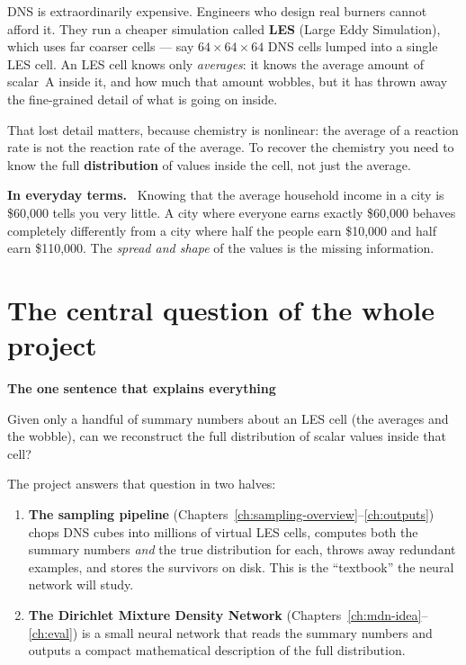 \documentclass[11pt,a4paper]{report}
\newcommand{\term}[1]{\textbf{#1}}
\renewcommand{\_}{\origtextunderscore\allowbreak}
\newlength{\calloutwidth}
\newcommand{\calloutOpen}{%
  \par\medskip\noindent
  \setlength{\calloutwidth}{\dimexpr\linewidth-2\fboxsep\relax}%
  \begin{lrbox}{\calloutbox}\begin{minipage}{\calloutwidth}}
\newcommand{\calloutClose}[1]{%
  \end{minipage}\end{lrbox}\colorbox{#1}{\usebox{\calloutbox}}\par\medskip}
\newenvironment{plainbox}[1]
  {\calloutOpen\textbf{#1}\par\medskip}
  {\calloutClose{BoxBG}}
\newenvironment{analogy}
  {\calloutOpen\textbf{In everyday terms.}\ }
  {\calloutClose{BoxBG}}
\begin{document}
DNS is extraordinarily expensive. Engineers who design real burners cannot afford it. They
run a cheaper simulation called \term{LES} (Large Eddy Simulation), which uses far coarser
cells --- say $64 \times 64 \times 64$ DNS cells lumped into a single LES cell. An LES cell
knows only \emph{averages}: it knows the average amount of scalar~A inside it, and how much
that amount wobbles, but it has thrown away the fine-grained detail of what is going on
inside.

That lost detail matters, because chemistry is nonlinear: the average of a reaction rate
is not the reaction rate of the average. To recover the chemistry you need to know the full
\term{distribution} of values inside the cell, not just the average.

\begin{analogy}
Knowing that the average household income in a city is \$60{,}000 tells you very little.
A city where everyone earns exactly \$60{,}000 behaves completely differently from a city
where half the people earn \$10{,}000 and half earn \$110{,}000. The \emph{spread and shape}
of the values is the missing information.
\end{analogy}

\section{The central question of the whole project}

\begin{plainbox}{The one sentence that explains everything}
Given only a handful of summary numbers about an LES cell (the averages and the wobble),
can we reconstruct the full distribution of scalar values inside that cell?
\end{plainbox}

The project answers that question in two halves:

\begin{enumerate}
  \item \textbf{The sampling pipeline} (Chapters~\ref{ch:sampling-overview}--\ref{ch:outputs})
        chops DNS cubes into millions of virtual LES cells, computes both the summary numbers
        \emph{and} the true distribution for each, throws away redundant examples, and stores
        the survivors on disk. This is the ``textbook'' the neural network will study.
  \item \textbf{The Dirichlet Mixture Density Network}
        (Chapters~\ref{ch:mdn-idea}--\ref{ch:eval}) is a small neural network that reads the
        summary numbers and outputs a compact mathematical description of the full distribution.
\end{enumerate}
\end{document}
